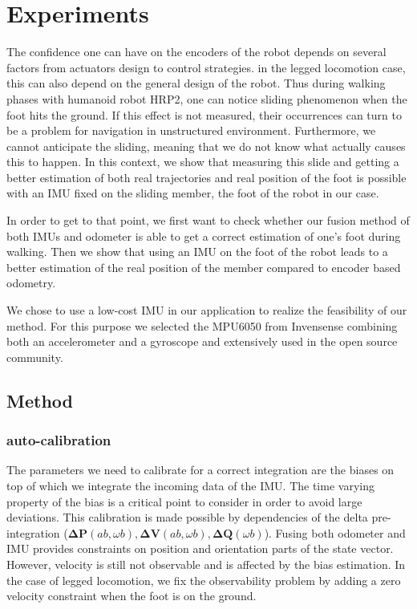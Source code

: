 
\section{Experiments} \label{sec:experiments}

The confidence one can have on the encoders of the robot depends on several factors from actuators design to control strategies. in the legged locomotion case, this can also depend on the general design of the robot.
Thus during walking phases with humanoid robot HRP2, one can notice sliding phenomenon when the foot hits the ground. If this effect is not measured, their occurrences can turn to be a problem for navigation in unstructured environment. 
Furthermore, we cannot anticipate the sliding, meaning that we do not know what actually causes this to happen. 
In this context, we show that measuring this slide and getting a better estimation of both real trajectories and real position of the foot is possible with an IMU fixed on the sliding member, the foot of the robot in our case.

In order to get to that point, we first want to check whether our fusion method of both IMUs and odometer is able to get a correct estimation of one's foot during walking.
Then we show that using an IMU on the foot of the robot leads to a better estimation of the real position of the member compared to encoder based odometry.

We chose to use a low-cost IMU in our application to realize the feasibility of our method. For this purpose we selected the 
MPU6050 from Invensense combining both an accelerometer and a gyroscope and extensively used in the open source community.



\subsection{Method}
\subsubsection{auto-calibration}

The parameters we need to calibrate for a correct integration are the biases on top of which we integrate the incoming data of the IMU.
The time varying property of the bias is a critical point to consider in order to avoid large deviations. This calibration is made possible
by dependencies of the delta pre-integration ($\boldsymbol{\Delta P}(ab, \omega b), \boldsymbol{\Delta V}(ab, \omega b), \boldsymbol{\Delta Q}(\omega b)$). Fusing both odometer and IMU provides constraints on position and orientation parts of
the state vector. However, velocity is still not observable and is affected by the bias estimation. In the case of legged locomotion, we fix the observability problem by adding a zero velocity constraint when the foot is on the ground.

